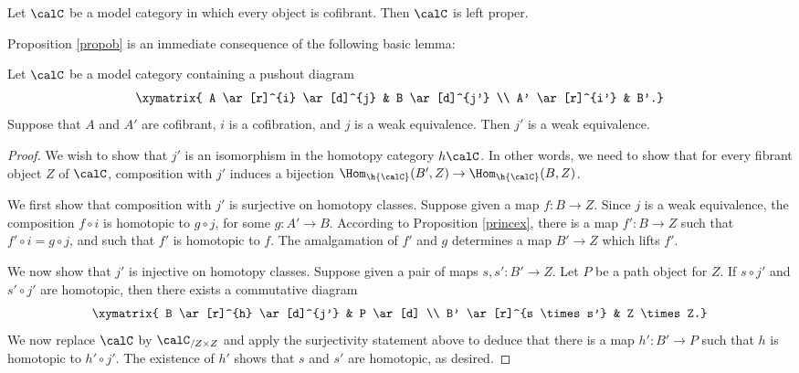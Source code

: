 \begin{Model Categories}
\begin{Already Read}
\begin{proposition}\label{propob}
Let $\calC$ be a model category in which every object is cofibrant. Then $\calC$ is left proper.
\end{proposition}

Proposition \ref{propob} is an immediate consequence of the following basic lemma:

\begin{lemma}
Let $\calC$ be a model category containing a pushout diagram
$$ \xymatrix{ A \ar[r]^{i} \ar[d]^{j} & B \ar[d]^{j'} \\
A' \ar[r]^{i'} & B'.}$$
Suppose that $A$ and $A'$ are cofibrant, $i$ is a cofibration, and $j$ is a weak equivalence.
Then $j'$ is a weak equivalence.
\end{lemma}

\begin{proof}
We wish to show that $j'$ is an isomorphism in the homotopy category $h\calC$. In other words, we need to show that for every fibrant object
$Z$ of $\calC$, composition with $j'$ induces a bijection $\Hom_{\h{\calC}}(B',Z) \rightarrow \Hom_{\h{ \calC}}(B,Z)$.

We first show that composition with $j'$ is surjective on homotopy classes. Suppose given
a map $f: B \rightarrow Z$. Since $j$ is a weak equivalence, the composition $f \circ i$ is homotopic to $g \circ j$, for some $g: A' \rightarrow B$. According to Proposition \ref{princex}, there
is a map $f': B \rightarrow Z$ such that $f' \circ i = g \circ j$, and such that $f'$ is homotopic to $f$. The amalgamation of $f'$ and $g$ determines a map $B' \rightarrow Z$ which lifts $f'$.

We now show that $j'$ is injective on homotopy classes. Suppose given a pair of maps
$s,s': B' \rightarrow Z$. Let $P$ be a path object for $Z$. If $s \circ j'$ and $s' \circ j'$ are homotopic, then there exists a commutative diagram
$$ \xymatrix{ B \ar[r]^{h} \ar[d]^{j'} & P \ar[d] \\
B' \ar[r]^{s \times s'} & Z \times Z.}$$
We now replace $\calC$ by $\calC_{/Z \times Z}$ and apply the surjectivity statement above
to deduce that there is a map $h': B' \rightarrow P$ such that $h$ is homotopic to $h' \circ j'$. The existence of $h'$ shows that $s$ and $s'$ are homotopic, as desired.
\end{proof}


\end{Already Read}
\end{Model Categories}
